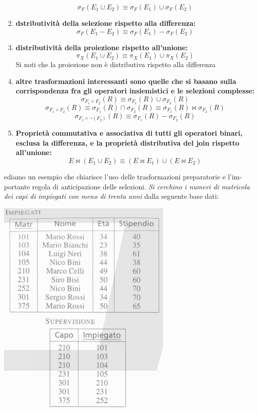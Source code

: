 \documentclass[a4paper,12pt, oneside]{book}
\begin{document}
\begin{enumerate}
  \[\sigma_{F}\left(E_{1} \cup E_{2}\right) \equiv \sigma_{F}\left(E_{1}\right) \cup \sigma_{F}\left(E_{2}\right)\]
\item \textbf{dstributività della selezione rispetto alla differenza:}
  \[\sigma_{F}\left(E_{1}-E_{2}\right) \equiv \sigma_{F}\left(E_{1}\right)-\sigma_{F}\left(E_{2}\right)\]
\item \textbf{distributività della proiezione rispetto all'unione:}
  \[\pi_{X}\left(E_{1} \cup E_{2}\right) \equiv \pi_{X}\left(E_{1}\right) \cup \pi_{X}\left(E_{2}\right)\]
  Si noti che la proiezione non è distributiva rispetto alla differenza
\item \textbf{altre trasformazioni interessanti sono quelle che si basano sulla corrispondenza
    fra gli operatori insiemistici e le selezioni complesse:}
  \[\sigma_{F_{1} \vee F_{2}}(R) \equiv \sigma_{F_{1}}(R) \cup \sigma_{F_{2}}(R)\]
  \[\sigma_{F_{1} \vee F_{2}}(R) \equiv \sigma_{F_{1}}(R) \cap \sigma_{F_{2}}(R)\equiv \sigma_{F_1}(R)\Join \sigma_{F_2}(R)\]
  \[\sigma_{F_{1} \wedge \neg\left(F_{2}\right)}(R) \equiv \sigma_{F_{1}}(R)-\sigma_{F_{2}}(R)\]
\item \textbf{Proprietà commutativa e associativa di tutti gli operatori binari,
    esclusa la differenza, e la proprietà distributiva del join rispetto all'unione:}
  \[E\Join (E_1\cup E_2)\equiv (E\Join E_1)\cup (E\Join E_2)\]
\end{enumerate}
 ediamo un esempio che chiarisce l'uso delle trasformazioni preparatorie e l'im-
portante regola di anticipazione delle selezioni. \textit{Si cerchino i numeri di matricola dei capi di
  impiegati con meno di trenta anni} dalla seguente base dati:
\begin{center}
\includegraphics[scale = 0.7]{img/alg18.png}
\end{center}
\end{document}
